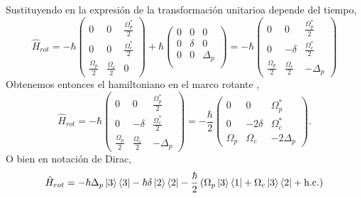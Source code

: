 Sustituyendo en la expresión de la transformación unitarioa depende del tiempo,
\begin{equation}
\hat{H}_{rot} = - \hbar \begin{pmatrix}
0 & 0 & \frac{\Omega_p^*}{2}  \\
0 & 0 & \frac{\Omega_c^*}{2}  \\
\frac{\Omega_p}{2} & \frac{\Omega_c}{2} & 0
\end{pmatrix} + \hbar 
\begin{pmatrix}
    0 & 0 & 0 \\
    0 & \delta & 0 \\
    0 & 0 &  \Delta_p \\
\end{pmatrix} = - \hbar \begin{pmatrix}
0 & 0 & \frac{\Omega_p^*}{2}  \\
0 & - \delta & \frac{\Omega_c^*}{2}  \\
\frac{\Omega_p}{2} & \frac{\Omega_c}{2} & - \Delta_p
\end{pmatrix}
\end{equation}
Obtenemos entonces el hamiltoniano en el marco rotante \cite{robertw.boydNonlinearOptics,scullyQuantumOptics1997a}, 
\begin{equation}
\boxed{
\hat{H}_{rot} = - \hbar \begin{pmatrix}
0 & 0 & \frac{\Omega_p^*}{2}  \\
0 & - \delta & \frac{\Omega_c^*}{2}  \\
\frac{\Omega_p}{2} & \frac{\Omega_c}{2} & - \Delta_p
\end{pmatrix}= - \frac{\hbar}{2} \begin{pmatrix}
    0 & 0 & \Omega_p^* \\
    0 & - 2 \delta & \Omega_c^* \\
    \Omega_p & \Omega_c & - 2 \Delta_p
\end{pmatrix}.
}    
\end{equation}
O bien en notación de Dirac,
\begin{equation*}
\hat{H}_{rot} = - \hbar \Delta_p \ket{3}\bra{3} - \hbar \delta \ket{2}\bra{2} - \frac{\hbar}{2} \left( \Omega_p \ket{3}\bra{1} + \Omega_c \ket{3}\bra{2} + \text{h.c.} \right)
\end{equation*}


